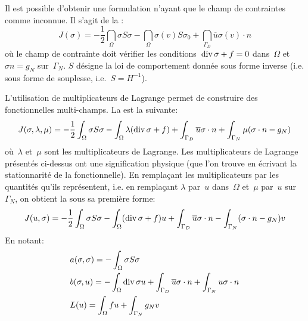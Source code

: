 \medskip
Il est possible d'obtenir une formulation n'ayant que le champ de contraintes comme inconnue. Il s'agit de la :
\begin{equation}
J(\sigma) =
-\frac12 \dint_\Omega \sigma S \sigma
-\dint_\Omega \sigma(v) S\sigma_0
+ \dint_{\Gamma_D} \overline{u} \sigma(v)\cdot n
\end{equation}
où le champ de contrainte doit vérifier les conditions~$\operatorname{div} \sigma + f =0$ dans~$\Omega$ et~$\sigma n = g_N$ sur~$\Gamma_N$. $S$ désigne la loi de comportement donnée sous forme inverse (i.e. sous forme de souplesse, i.e.~$S=H^{-1}$).

\medskip
L'utilisation de multiplicateurs de Lagrange permet de construire des fonctionnelles multi-champs. La  est la suivante:
\begin{equation}
J(\sigma,\lambda,\mu) =
-\frac12\displaystyle\int_\Omega \sigma S \sigma
-\displaystyle\int_\Omega \lambda (\operatorname{div} \sigma + f)
+ \displaystyle\int_{\Gamma_D} \overline{u}\sigma\cdot n
+ \displaystyle\int_{\Gamma_N} \mu (\sigma\cdot n -g_N)
\end{equation}
où~$\lambda$ et~$\mu$ sont les multiplicateurs de Lagrange.
\medskipvm
Les multiplicateurs de Lagrange présentés ci-dessus ont une signification physique (que l'on trouve en écrivant la stationnarité de la fonctionnelle). En remplaçant les multiplicateurs par les quantités qu'ils représentent, i.e. en remplaçant $\lambda$ par~$u$ dans~$\Omega$ et~$\mu$ par~$u$ sur~$\Gamma_N$, on obtient la  sous sa première forme:
\begin{equation}\label{Eq-Fonc-Reiss}
J(u,\sigma) =
-\frac12 \displaystyle\int_\Omega \sigma S \sigma
-\displaystyle\int_\Omega (\operatorname{div} \sigma+f) u
+ \displaystyle\int_{\Gamma_D} \overline{u}\sigma\cdot n
- \displaystyle\int_{\Gamma_N} (\sigma\cdot n-g_N) v
\end{equation}
En notant:
\begin{align} 
&a(\sigma,\sigma)=-\displaystyle\int_\Omega \sigma S\sigma\\
&b(\sigma,u)=-\displaystyle\int_\Omega \operatorname{div}\sigma u + \displaystyle\int_{\Gamma_D} \overline{u}\sigma\cdot n + \displaystyle\int_{\Gamma_N} u\sigma\cdot n\\
&L(u)=\displaystyle\int_\Omega fu + \displaystyle\int_{\Gamma_N} g_N v\end{align}
